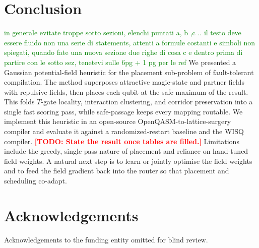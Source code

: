 \documentclass[10pt,conference]{IEEEtran}
\theoremstyle{definition}
\theoremstyle{remark}
\newcommand{\todo}[1]{\textcolor{red}{\textbf{[TODO: #1]}}}
\begin{document}
\section{Conclusion}
\label{sec:conclusion}
\textcolor{green}{in generale evitate troppe sotto sezioni, elenchi puntati a, b ,c .. il testo deve essere fluido non una serie di statements, attenti a formule  costanti e simboli non spiegati, quando fate una nuova sezione due righe di cosa c e dentro prima di partire con le sotto sez, tenetevi sulle 6pg + 1 pg per le ref}
We presented a Gaussian potential-field heuristic for the placement sub-problem
of fault-tolerant compilation. The method superposes attractive magic-state and
partner fields with repulsive fields, then places each qubit at the
safe maximum of the result. This folds $T$-gate
locality, interaction clustering, and corridor preservation into a single fast
scoring pass, while safe-passage keeps every mapping routable. We
implement this heuristic in an open-source OpenQASM-to-lattice-surgery compiler and evaluate
it against a randomized-restart baseline and the WISQ compiler.
\todo{State the result once tables are filled.}
Limitations include the greedy, single-pass nature of placement and reliance on
hand-tuned field weights. A natural next step is to learn or jointly optimise
the field weights and to feed the field gradient back into the router so that
placement and scheduling co-adapt.


\section*{Acknowledgements}
  Acknowledgements to the funding entity omitted for blind review.






\end{document}
